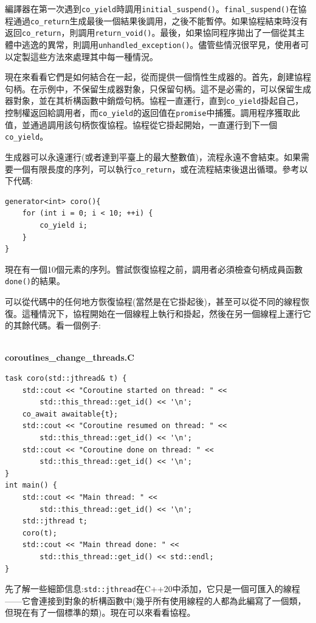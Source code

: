 編譯器在第一次遇到\texttt{co\_yield}時調用\texttt{initial\_suspend()}。\texttt{final\_suspend()}在協程通過\texttt{co\_return}生成最後一個結果後調用，之後不能暫停。如果協程結束時沒有返回\texttt{co\_return}，則調用\texttt{return\_void()}。最後，如果協同程序拋出了一個從其主體中逃逸的異常，則調用\texttt{unhandled\_exception()}。儘管些情況很罕見，使用者可以定製這些方法來處理其中每一種情況。

現在來看看它們是如何結合在一起，從而提供一個惰性生成器的。首先，創建協程句柄。在示例中，不保留生成器對象，只保留句柄。這不是必需的，可以保留生成器對象，並在其析構函數中銷燬句柄。協程一直運行，直到\texttt{co\_yield}掛起自己，控制權返回給調用者，而\texttt{co\_yield}的返回值在\texttt{promise}中捕獲。調用程序獲取此值，並通過調用該句柄恢復協程。協程從它掛起開始，一直運行到下一個\texttt{co\_yield}。 

生成器可以永遠運行(或者達到平臺上的最大整數值)，流程永遠不會結束。如果需要一個有限長度的序列，可以執行\texttt{co\_return}，或在流程結束後退出循環。參考以下代碼:

\begin{lstlisting}[style=styleCXX]
generator<int> coro(){
	for (int i = 0; i < 10; ++i) {
		co_yield i;
	}
}
\end{lstlisting}

現在有一個10個元素的序列。嘗試恢復協程之前，調用者必須檢查句柄成員函數\texttt{done()}的結果。

可以從代碼中的任何地方恢復協程(當然是在它掛起後)，甚至可以從不同的線程恢復。這種情況下，協程開始在一個線程上執行和掛起，然後在另一個線程上運行它的其餘代碼。看一個例子:

\hspace*{\fill} \\ %
\noindent
\textbf{coroutines\_change\_threads.C}
\begin{lstlisting}[style=styleCXX]
task coro(std::jthread& t) {
	std::cout << "Coroutine started on thread: " <<
		std::this_thread::get_id() << '\n';
	co_await awaitable{t};
    std::cout << "Coroutine resumed on thread: " <<
		std::this_thread::get_id() << '\n';
	std::cout << "Coroutine done on thread: " <<
		std::this_thread::get_id() << '\n';
}
int main() {
	std::cout << "Main thread: " <<
		std::this_thread::get_id() << '\n';
	std::jthread t;
	coro(t);
	std::cout << "Main thread done: " << 
		std::this_thread::get_id() << std::endl;
}
\end{lstlisting}

先了解一些細節信息:\texttt{std::jthread}在C++20中添加，它只是一個可匯入的線程——它會連接到對象的析構函數中(幾乎所有使用線程的人都為此編寫了一個類，但現在有了一個標準的類)。現在可以來看看協程。 

